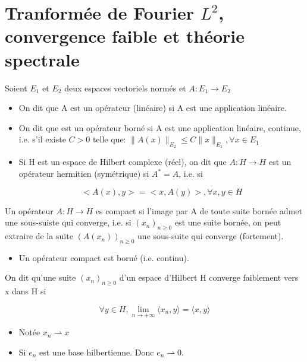 \documentclass[10pt,a4paper,oneside]{article}
\newenvironment{definition}[1][Definition]{\begin{trivlist}
\item[\hskip \labelsep {\bfseries #1}]}{\end{trivlist}}
\begin{document}
\section{Tranformée de Fourier $L^2$, convergence faible et théorie spectrale}


\begin{definition}

\item
Soient $E_1$ et $E_2$ deux espaces vectoriels normés et $A: E_1 \rightarrow E_2$

\begin{itemize}

\item
On dit que A est un opérateur (linéaire) si A est une application linéaire.

\item

On dit que est un opérateur borné si A est une application linéaire, continue, i.e. s'il existe $C > 0$ telle que: $\|A(x)\|_{E_2} \leq C \|x\|_{E_1}, \forall x \in E_1$

\item
Si H est un espace de Hilbert complexe (réel), on dit que $A: H \rightarrow H$ est un opérateur hermitien (symétrique) si $A^* = A$, i.e. si

\[ <A(x),y> = <x,A(y)>, \forall x,y \in H \]

\end{itemize}

\end{definition}


\begin{definition}
Un opérateur $A: H \rightarrow H$ es compact si l'image par A de toute suite bornée admet une sous-suiste qui converge, i.e. si $(x_n)_{n\geq0}$ est une suite bornée, on peut extraire de la suite $(A(x_n))_{n\geq0}$ une sous-suite qui converge (fortement).

\begin{itemize}
\item
Un opérateur compact est borné (i.e. continu).
\end{itemize}

\end{definition}


\begin{definition}
On dit qu'une suite $(x_n)_{n\geq0}$ d'un espace d'Hilbert H converge faiblement vers x dans H si

\[ \forall y \in H, \lim\limits_{n\rightarrow+\infty}\langle x_n,y \rangle = \langle x,y \rangle \]

\begin{itemize}

\item
Notée $x_n \rightharpoonup x$

\item
Si $e_n$ est une base hilbertienne. Donc $e_n \rightharpoonup 0$.

\end{itemize}

\end{definition}
\end{document}
